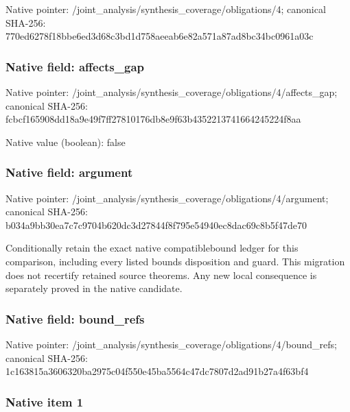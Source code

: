 \documentclass[10pt,a4paper]{article}
\begin{document}
Native pointer: /joint\_analysis/synthesi\allowbreak{}s\_coverage/obligations/4; canonical SHA-256: 770ed6278f18bbe6ed3d68c3\allowbreak{}bd1d758aeeab6e82a571a87a\allowbreak{}d8bc34bc0961a03c



\subsubsection{Native field: affects\_gap}


Native pointer: /joint\_analysis/synthesi\allowbreak{}s\_coverage/obligations/4\allowbreak{}/affects\_gap; canonical SHA-256: fcbcf165908dd18a9e49f7ff\allowbreak{}27810176db8e9f63b4352213\allowbreak{}741664245224f8aa



Native value (boolean): false



\subsubsection{Native field: argument}


Native pointer: /joint\_analysis/synthesi\allowbreak{}s\_coverage/obligations/4\allowbreak{}/argument; canonical SHA-256: b034a9bb30ea7c7c9704b620\allowbreak{}dc3d27844f8f795e54940ec8\allowbreak{}dac69c8b5f47de70


Conditionally retain the exact native compatiblebound ledger for this comparison, including every listed bounds disposition and guard. This migration does not recertify retained source theorems. Any new local consequence is separately proved in the native candidate.


\subsubsection{Native field: bound\_refs}


Native pointer: /joint\_analysis/synthesi\allowbreak{}s\_coverage/obligations/4\allowbreak{}/bound\_refs; canonical SHA-256: 1c163815a3606320ba2975c0\allowbreak{}4f550e45ba5564c47dc7807d\allowbreak{}2ad91b27a4f63bf4



\subsubsection{Native item 1}
\end{document}
